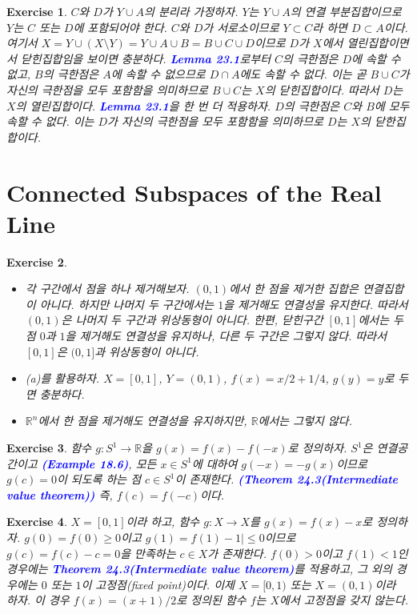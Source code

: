 \documentclass{article}
\newtheorem{exercise}{Exercise}[section]
\newcommand{\R}{\mathbb{R}}
\begin{document}
\begin{exercise}
    $C$와 $D$가 $Y\cup A$의 분리라 가정하자. $Y$는 $Y\cup A$의 연결 부분집합이므로 $Y$는 $C$ 또는 $D$에 포함되어야 한다. $C$와 $D$가 서로소이므로 $Y\subset C$라 하면 $D\subset A$이다. 여기서 $X=Y\cup(X\setminus Y)=Y\cup A\cup B=B\cup C\cup D$이므로 $D$가 $X$에서 열린집합이면서 닫힌집합임을 보이면 충분하다. \textcolor{blue}{\textbf{Lemma 23.1}}로부터 $C$의 극한점은 $D$에 속할 수 없고, $B$의 극한점은 $A$에 속할 수 없으므로 $D\cap A$에도 속할 수 없다. 이는 곧 $B\cup C$가 자신의 극한점을 모두 포함함을 의미하므로 $B\cup C$는 $X$의 닫힌집합이다. 따라서 $D$는 $X$의 열린집합이다. \textcolor{blue}{\textbf{Lemma 23.1}}을 한 번 더 적용하자. $D$의 극한점은 $C$와 $B$에 모두 속할 수 없다. 이는 $D$가 자신의 극한점을 모두 포함함을 의미하므로 $D$는 $X$의 닫한집합이다.
\end{exercise}

\section{Connected Subspaces of the Real Line}

\begin{exercise}
    \phantom{}
    \begin{itemize}
        \item[(a)] 각 구간에서 점을 하나 제거해보자. $(0,1)$에서 한 점을 제거한 집합은 연결집합이 아니다. 하지만 나머지 두 구간에서는 $1$을 제거해도 연결성을 유지한다. 따라서 $(0,1)$은 나머지 두 구간과 위상동형이 아니다. 한편, 닫힌구간 $[0,1]$에서는 두 점 $0$과 $1$을 제거해도 연결성을 유지하나, 다른 두 구간은 그렇지 않다. 따라서 $[0,1]$은 $(0,1]$과 위상동형이 아니다.
        \item[(b)] (a)를 활용하자. $X=[0,1]$, $Y=(0,1)$, $f(x)=x/2+1/4$, $g(y)=y$로 두면 충분하다.
        \item[(c)] $\R^n$에서 한 점을 제거해도 연결성을 유지하지만, $\R$에서는 그렇지 않다.
    \end{itemize}
\end{exercise}

\begin{exercise}
    함수 $g:S^1\to\R$을 $g(x)=f(x)-f(-x)$로 정의하자. $S^1$은 연결공간이고 \textcolor{blue}{\textbf{(Example 18.6)}}, 모든 $x\in S^1$에 대하여 $g(-x)=-g(x)$이므로 $g(c)=0$이 되도록 하는 점 $c\in S^1$이 존재한다. \textcolor{blue}{\textbf{(Theorem 24.3(Intermediate value theorem))}} 즉, $f(c)=f(-c)$이다.
\end{exercise}

\begin{exercise}
    $X=[0,1]$이라 하고, 함수 $g:X\to X$를 $g(x)=f(x)-x$로 정의하자. $g(0)=f(0)\geq0$이고 $g(1)=f(1)-1|\leq0$이므로 $g(c)=f(c)-c=0$을 만족하는 $c\in X$가 존재한다. $f(0)>0$이고 $f(1)<1$인 경우에는 \textcolor{blue}{\textbf{Theorem 24.3(Intermediate value theorem)}}를 적용하고, 그 외의 경우에는 $0$ 또는 $1$이 고정점(fixed point)이다. 이제 $X=[0,1)$ 또는 $X=(0,1)$이라 하자. 이 경우 $f(x)=(x+1)/2$로 정의된 함수 $f$는 $X$에서 고정점을 갖지 않는다.
\end{exercise}
\end{document}
